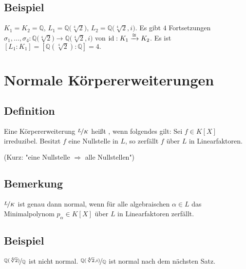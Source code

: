 \subsection[Beispiel: Anzahl von von Fortsetzungen]{Beispiel} %
\label{sub:1417}
$K_1 = K_2 = \mathds{Q}$, $L_1 = \mathds{Q}\big(\sqrt[4]{2}\big)$, $L_2 = \mathds{Q}\big(\sqrt[4]{2},i\big)$. Es gibt $4$ Fortsetzungen $\sigma_1, \ldots , \sigma_4 : \mathds{Q}\big(\sqrt[4]{2}\big) \to \mathds{Q}\big(\sqrt[4]{2},i\big)$ von $\id : K_1 \xrightarrow{\cong} K_2 $. Es ist $[L_1 :K_1] = \left[\mathds{Q}(\sqrt[4]{2}) : \mathds{Q}\right] = 4.$
\newpage
\section{Normale Körpererweiterungen} %
\label{sec:15}

\subsection[Definition: normale Körpererweiterung]{Definition} %
\label{sub:151}
Eine Körpererweiterung $\nicefrac{L}{K}$ heißt , wenn folgendes gilt: Sei $f \in K[X]$ irreduzibel. Besitzt $f$ eine Nullstelle
in $L$, so zerfällt $f$ über $L$ in Linearfaktoren.

(Kurz: "{}eine Nullstelle $\Longrightarrow$ alle Nullstellen"{})

\subsection[Bemerkung: alternative Charakterisierung von normalen Körpererweiterungen]{Bemerkung} %
\label{sub:152}
$\nicefrac{L}{K}$ ist genau dann normal, wenn für alle algebraischen $\alpha \in L$ das Minimalpolynom $p_\alpha \in K[X]$ über $L$ in Linearfaktoren zerfällt.

\subsection[Beispiel für eine normale Körpererweiterung]{Beispiel} %
\label{sub:153}
$\nicefrac{\mathds{Q}(\sqrt[4]{2})}{\mathds{Q}}$ ist nicht normal. $\nicefrac{\mathds{Q}(\sqrt[4]{2},i)}{\mathds{Q}}$ ist normal nach dem nächsten Satz.

